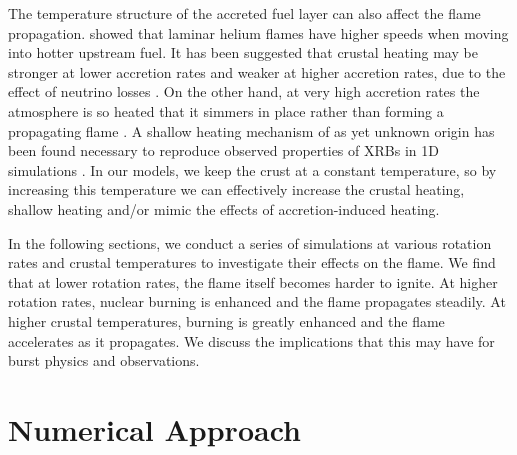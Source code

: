 \documentclass[preprint,times,tighten]{aastex63}
\begin{document}
The temperature structure of the accreted fuel layer can also affect
the flame propagation.  \citet{Timmes00} showed that laminar helium flames 
have higher speeds when moving into hotter upstream fuel.
It has been suggested that crustal heating may be stronger at lower
accretion rates and weaker at higher accretion rates, due to the
effect of neutrino losses \citep{Cumming2006,johnston:2019}. On the other hand, at very high accretion rates the atmosphere is so heated that it simmers in place rather than forming a propagating flame \citep{fujimoto1981,bildsten1998thermonuclear,keek2009effect}. 
A shallow heating
mechanism of as yet unknown origin has been found necessary to
reproduce observed properties of XRBs in 1D simulations
\citep{Deibel2015,Turlione2015,Keek2017}.
In our
models, we keep the crust at a constant temperature, so by increasing
this temperature we can effectively increase the crustal heating, shallow heating
and/or
mimic the effects of accretion-induced heating. 

In the following sections, we conduct a series of simulations at various rotation 
rates and crustal temperatures to investigate their effects on the flame. We find that 
at lower rotation rates, the flame itself becomes harder to ignite. At higher 
rotation rates, nuclear burning is enhanced and the flame propagates steadily. 
At higher crustal temperatures, burning is greatly enhanced and the flame accelerates as 
it propagates. We discuss the implications that this may have for burst physics 
and observations. 


\section{Numerical Approach}\label{Sec:numerics}
\end{document}
